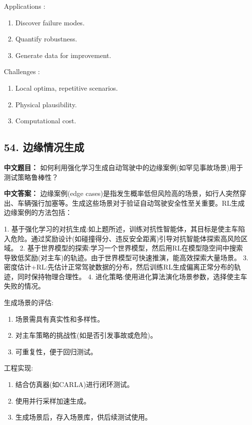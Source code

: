 \documentclass[10pt,a4paper]{ctexart}
\begin{document}
 Applications :
\begin{enumerate}
    \item Discover failure modes.
    \item Quantify robustness.
    \item Generate data for improvement.
\end{enumerate}

 Challenges :
\begin{enumerate}
    \item Local optima, repetitive scenarios.
    \item Physical plausibility.
    \item Computational cost.
\end{enumerate}

\subsection*{54. 边缘情况生成}
\textbf{中文题目：} 如何利用强化学习生成自动驾驶中的边缘案例(如罕见事故场景)用于测试策略鲁棒性？

\textbf{中文答案：}  
边缘案例(edge cases)是指发生概率低但风险高的场景，如行人突然穿出、车辆强行加塞等。生成这些场景对于验证自动驾驶安全性至关重要。RL生成边缘案例的方法包括：

1.  基于强化学习的对抗生成:如上题所述，训练对抗性智能体，其目标是使主车陷入危险。通过奖励设计(如碰撞得分、违反安全距离)引导对抗智能体探索高风险区域。
2.  基于世界模型的探索:学习一个世界模型，然后用RL在模型隐空间中搜索导致低奖励(对主车)的轨迹。由于世界模型可快速推演，能高效探索大量场景。
3.  密度估计+RL:先估计正常驾驶数据的分布，然后训练RL生成偏离正常分布的轨迹，同时保持物理合理性。
4.  进化策略:使用进化算法演化场景参数，选择使主车失败的情况。

 生成场景的评估:
\begin{enumerate}
    \item 场景需具有真实性和多样性。
    \item 对主车策略的挑战性(如是否引发事故或危险)。
    \item 可重复性，便于回归测试。
\end{enumerate}

 工程实现:
\begin{enumerate}
    \item 结合仿真器(如CARLA)进行闭环测试。
    \item 使用并行采样加速生成。
    \item 生成场景后，存入场景库，供后续测试使用。
\end{enumerate}
\end{document}
